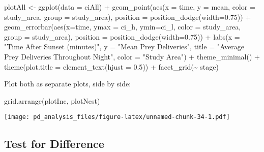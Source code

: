 \documentclass[
]{article}
\newenvironment{Shaded}{\begin{snugshade}}{\end{snugshade}}
\newcommand{\AttributeTok}[1]{\textcolor[rgb]{0.77,0.63,0.00}{#1}}
\newcommand{\FloatTok}[1]{\textcolor[rgb]{0.00,0.00,0.81}{#1}}
\newcommand{\FunctionTok}[1]{\textcolor[rgb]{0.00,0.00,0.00}{#1}}
\newcommand{\NormalTok}[1]{#1}
\newcommand{\OtherTok}[1]{\textcolor[rgb]{0.56,0.35,0.01}{#1}}
\newcommand{\SpecialCharTok}[1]{\textcolor[rgb]{0.00,0.00,0.00}{#1}}
\newcommand{\StringTok}[1]{\textcolor[rgb]{0.31,0.60,0.02}{#1}}
\begin{document}
\begin{Shaded}
\begin{Highlighting}[]
\NormalTok{plotAll }\OtherTok{\textless{}{-}} \FunctionTok{ggplot}\NormalTok{(}\AttributeTok{data =}\NormalTok{ ciAll) }\SpecialCharTok{+}
  \FunctionTok{geom\_point}\NormalTok{(}\FunctionTok{aes}\NormalTok{(}\AttributeTok{x =}\NormalTok{ time, }\AttributeTok{y =}\NormalTok{ mean, }\AttributeTok{color =}\NormalTok{ study\_area, }\AttributeTok{group =}\NormalTok{ study\_area),}
             \AttributeTok{position =} \FunctionTok{position\_dodge}\NormalTok{(}\AttributeTok{width=}\FloatTok{0.75}\NormalTok{)) }\SpecialCharTok{+}
  \FunctionTok{geom\_errorbar}\NormalTok{(}\FunctionTok{aes}\NormalTok{(}\AttributeTok{x=}\NormalTok{time, }\AttributeTok{ymax =}\NormalTok{ ci\_h, }\AttributeTok{ymin=}\NormalTok{ci\_l, }\AttributeTok{color =}\NormalTok{ study\_area, }
                    \AttributeTok{group =}\NormalTok{ study\_area),}
                \AttributeTok{position =} \FunctionTok{position\_dodge}\NormalTok{(}\AttributeTok{width=}\FloatTok{0.75}\NormalTok{)) }\SpecialCharTok{+}
  \FunctionTok{labs}\NormalTok{(}\AttributeTok{x =} \StringTok{"Time After Sunset (minutes)"}\NormalTok{, }\AttributeTok{y =} \StringTok{"Mean Prey Deliveries"}\NormalTok{, }
       \AttributeTok{title =} \StringTok{"Average Prey Deliveries Throughout Night"}\NormalTok{, }\AttributeTok{color =} \StringTok{"Study Area"}\NormalTok{) }\SpecialCharTok{+}
  \FunctionTok{theme\_minimal}\NormalTok{() }\SpecialCharTok{+}
  \FunctionTok{theme}\NormalTok{(}\AttributeTok{plot.title =} \FunctionTok{element\_text}\NormalTok{(}\AttributeTok{hjust =} \FloatTok{0.5}\NormalTok{)) }\SpecialCharTok{+}
  \FunctionTok{facet\_grid}\NormalTok{(}\SpecialCharTok{\textasciitilde{}}\NormalTok{ stage)}
\end{Highlighting}
\end{Shaded}

Plot both as separate plots, side by side:

\begin{Shaded}
\begin{Highlighting}[]
\FunctionTok{grid.arrange}\NormalTok{(plotInc, plotNest)}
\end{Highlighting}
\end{Shaded}

\texttt{[image: pd\_analysis\_files/figure-latex/unnamed-chunk-34-1.pdf]}

\hypertarget{test-for-difference-1}{%
\subsection{Test for Difference}\label{test-for-difference-1}}
\end{document}
